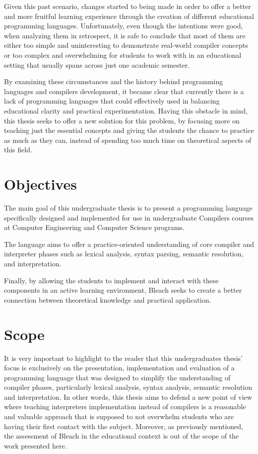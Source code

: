 Given this past scenario, changes started to being made in order to offer a better and more fruitful learning experience through the creation of different educational programming languages. Unfortunately, even though the intentions were good, when analyzing them in retrospect, it is safe to conclude that most of them are either too simple and uninteresting to demonstrate real-world compiler concepts or too complex and overwhelming for students to work with in an educational setting that usually spans across just one academic semester.

By examining these circumstances and the history behind programming languages and compilers development, it became clear that currently there is a lack of programming languages that could effectively used in balancing educational clarity and practical experimentation. Having this obstacle in mind, this thesis seeks to offer a new solution for this problem, by focusing more on teaching just the essential concepts and giving the students the chance to practice as much as they can, instead of spending too much time on theoretical aspects of this field.

\section{Objectives}
The main goal of this undergraduate thesis is to present a programming language specifically designed and implemented for use in undergraduate Compilers courses at Computer Engineering and Computer Science programs.

The language aims to offer a practice-oriented understanding of core compiler and interpreter phases such as lexical analysis, syntax parsing, semantic resolution, and interpretation.

Finally, by allowing the students to implement and interact with these components in an active learning environment, Bleach seeks to create a better connection between theoretical knowledge and practical application.

\section{Scope}
It is very important to highlight to the reader that this undergraduates thesis' focus is exclusively on the presentation, implementation and evaluation of a programming language that was designed to simplify the understanding of compiler phases, particularly lexical analysis, syntax analysis, semantic resolution and interpretation. In other words, this thesis aims to defend a new point of view where teaching interpreters implementation instead of compilers is a reasonable and valuable approach that is supposed to not overwhelm students who are having their first contact with the subject. Moreover, as previously mentioned, the assessment of Bleach in the educational context is out of the scope of the work presented here.

